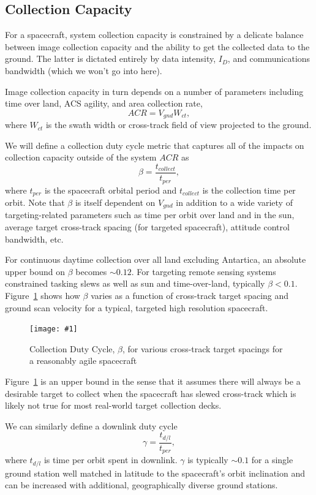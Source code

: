 \documentclass[10pt,journal]{IEEEtran}  %
\newcommand{\includefigure}[3]
{
  \begin{figure}[h!]
  \centering
  \texttt{[image: \#1]}
  \caption[]{#3}
  \label{#2}
  \end{figure}
}
\begin{document}
\subsection{Collection Capacity}
\label{sec:capacity}
For a spacecraft, system collection capacity is constrained by a delicate balance between image collection capacity and the ability to get the collected data to the ground.  The latter is dictated entirely by data intensity, $I_D$, and communications bandwidth (which we won't go into here).  

Image collection capacity in turn depends on a number of parameters including time over land, ACS agility, and area collection rate,
\begin{equation}
    ACR = V_{gnd}W_{ct},
\end{equation}
where $W_{ct}$ is the swath width or cross-track field of view projected to the ground.

We will define a collection duty cycle metric that captures all of the impacts on collection capacity outside of the system $ACR$ as
\begin{equation}
    \beta = \frac{t_{collect}}{t_{per}},
\end{equation} 
where $t_{per}$ is the spacecraft orbital period and $t_{collect}$ is the collection time per orbit.  Note that $\beta$ is itself dependent on $V_{gnd}$ in addition to a wide variety of targeting-related parameters such as time per orbit over land and in the sun, average target cross-track spacing (for targeted spacecraft), attitude control bandwidth, etc.

For continuous daytime collection over all land excluding Antartica, an absolute upper bound on $\beta$ becomes $\sim 0.12$.  For targeting remote sensing systems constrained tasking slews as well as sun and time-over-land, typically $\beta < 0.1$.  Figure~\ref{fig:beta} shows how $\beta$ varies as a function of cross-track target spacing and ground scan velocity for a typical, targeted high resolution spacecraft.

\includefigure{figures/collection_dc.pgf}{fig:beta}{Collection Duty Cycle, $\beta$, for various cross-track target spacings for a reasonably agile spacecraft}

Figure~\ref{fig:beta} is an upper bound in the sense that it assumes there will always be a desirable target to collect when the spacecraft has slewed cross-track which is likely not true for most real-world target collection decks.  

We can similarly define a downlink duty cycle
\begin{equation}
    \gamma = \frac{t_{d/l}}{t_{per}},
\end{equation}
where $t_{d/l}$ is time per orbit spent in downlink.  $\gamma$ is typically $\sim 0.1$ for a single ground station well matched in latitude to the spacecraft's orbit inclination and can be increased with additional, geographically diverse ground stations.
\end{document}
